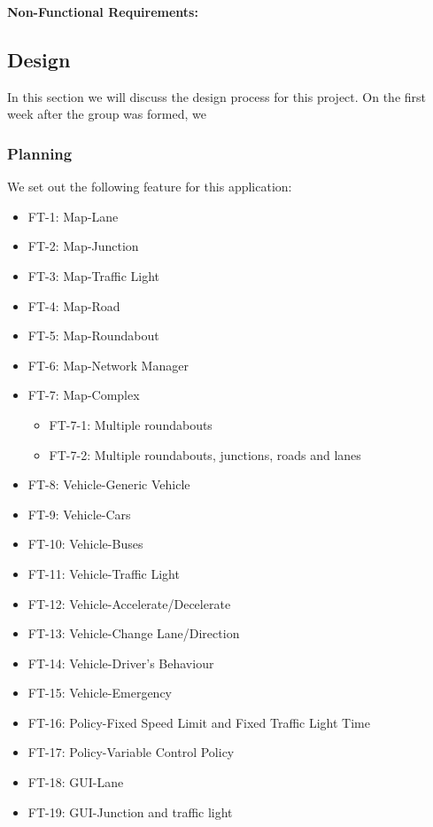 \documentclass[11pt]{article}
\begin{document}
    
    {\bf{Non-Functional Requirements:}} \newline
    
	
\subsection{Design}
In this section we will discuss the design process for this project. On the first week after the group was formed, we 

    \subsubsection{Planning}
    We set out the following feature for this application:
    
    \begin{itemize}[noitemsep]
    	\item FT-1: Map-Lane
    	\item FT-2: Map-Junction
    	\item FT-3: Map-Traffic Light
    	\item FT-4: Map-Road
    	\item FT-5: Map-Roundabout
    	\item FT-6: Map-Network Manager
    	\item FT-7: Map-Complex
    		\begin{itemize}
        	\item FT-7-1: Multiple roundabouts
        	\item FT-7-2: Multiple roundabouts, junctions, roads and lanes
        	\end{itemize}
    	\item FT-8: Vehicle-Generic Vehicle
    	\item FT-9: Vehicle-Cars
    	\item FT-10: Vehicle-Buses
    	\item FT-11: Vehicle-Traffic Light
    	\item FT-12: Vehicle-Accelerate/Decelerate
    	\item FT-13: Vehicle-Change Lane/Direction
    	\item FT-14: Vehicle-Driver's Behaviour
    	\item FT-15: Vehicle-Emergency
    	\item FT-16: Policy-Fixed Speed Limit and Fixed Traffic Light Time
    	\item FT-17: Policy-Variable Control Policy
    	\item FT-18: GUI-Lane
    	\item FT-19: GUI-Junction and traffic light

\end{itemize}
\end{document}
